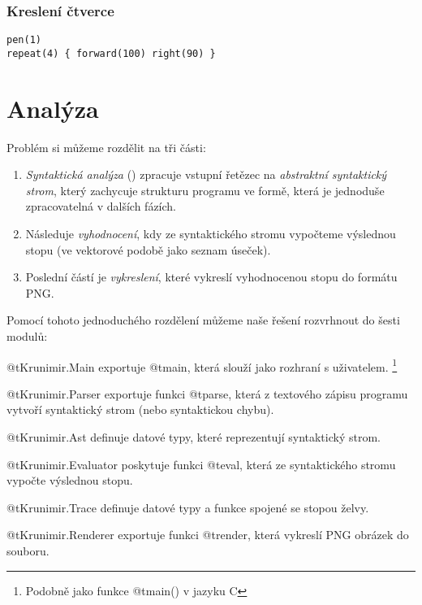 
\subsubsection{Kreslení čtverce}

\begin{verbatim}
pen(1)
repeat(4) { forward(100) right(90) }
\end{verbatim}


\section{Analýza}

Problém si můžeme rozdělit na tři části:

\begin{enumerate}

\item \emph{Syntaktická analýza} () zpracuje vstupní řetězec na
  \emph{abstraktní syntaktický strom}, který zachycuje strukturu programu ve
  formě, která je jednoduše zpracovatelná v dalších fázích.

\item Následuje \emph{vyhodnocení}, kdy ze syntaktického stromu vypočteme
  výslednou stopu (ve vektorové podobě jako seznam úseček).

\item Poslední částí je \emph{vykreslení}, které vykreslí vyhodnocenou stopu do
  formátu PNG.

\end{enumerate}

Pomocí tohoto jednoduchého rozdělení můžeme naše řešení rozvrhnout do šesti
modulů:

\begin{description}

\item @t{Krunimir.Main} exportuje @t{main}, která slouží jako rozhraní s
uživatelem. \footnote{Podobně jako funkce @t{main()} v jazyku C}

\item @t{Krunimir.Parser} exportuje funkci @t{parse}, která z textového
zápisu programu vytvoří syntaktický strom (nebo syntaktickou chybu).

\item @t{Krunimir.Ast} definuje datové typy, které reprezentují syntaktický
strom.

\item @t{Krunimir.Evaluator} poskytuje funkci @t{eval}, která ze
syntaktického stromu vypočte výslednou stopu.

\item @t{Krunimir.Trace} definuje datové typy a funkce spojené se stopou želvy.

\item @t{Krunimir.Renderer} exportuje funkci @t{render}, která vykreslí PNG
obrázek do souboru.

\end{description}





